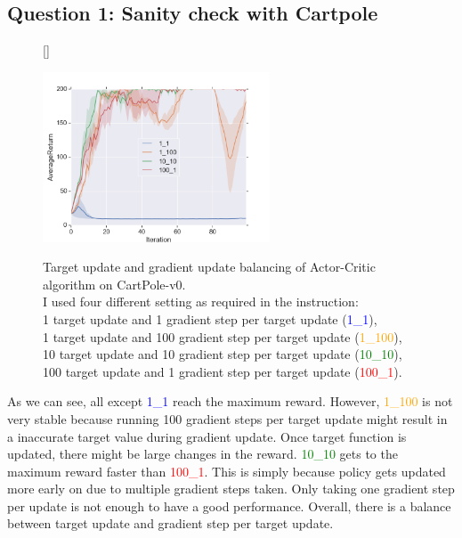 \documentclass[12pt]{article}
\newcounter{question}
\begin{document}
  \subsection{Question 1: Sanity check with Cartpole}
  \begin{figure}[!htbp] 
  	[\FBwidth]
  	{\caption[caption]{
  			Target update and gradient update balancing of Actor-Critic algorithm on CartPole-v0.\\
  			\hspace{0.4\textwidth}
  			I used four different setting as required in the instruction: \\
  			\hspace{0.4\textwidth}
  			1 target update and 1 gradient step per target update (\textcolor{blue}{1\_1}),\\
  			\hspace{0.4\textwidth}
			1 target update and 100 gradient step per target update (\textcolor{orange}{1\_100}), \\
			\hspace{0.4\textwidth}
			10 target update and 10 gradient step per target update (\textcolor{green}{10\_10}),\\
			\hspace{0.4\textwidth}
			100 target update and 1 gradient step per target update (\textcolor{red}{100\_1}).
  		}\label{fig:ac}}
  	{\includegraphics[width=0.6\textwidth]{question2_1.png}}
  \end{figure}
  As we can see, all except \textcolor{blue}{1\_1} reach the maximum reward.  However, \textcolor{orange}{1\_100} is not very stable because running 100 gradient steps per target update might result in a inaccurate target value during gradient update. Once target function is updated, there might be large changes in the reward.  \textcolor{green}{10\_10} gets to the maximum reward faster than \textcolor{red}{100\_1}.  This is simply because policy gets updated more early on due to multiple gradient steps taken.  Only taking one gradient step per update is not enough to have a good performance.  Overall, there is a balance between target update and gradient step per target update.
  
\end{document}
